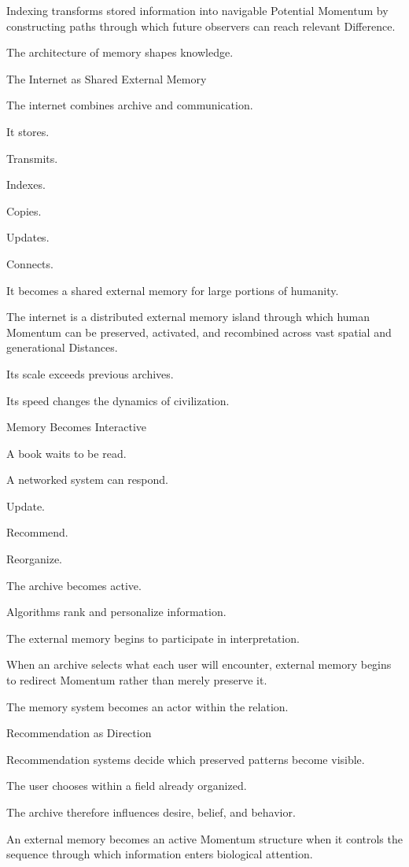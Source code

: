 Indexing transforms stored information into navigable Potential Momentum by constructing paths through which future observers can reach relevant Difference.

The architecture of memory shapes knowledge.

The Internet as Shared External Memory

The internet combines archive and communication.

It stores.

Transmits.

Indexes.

Copies.

Updates.

Connects.

It becomes a shared external memory for large portions of humanity.

The internet is a distributed external memory island through which human Momentum can be preserved, activated, and recombined across vast spatial and generational Distances.

Its scale exceeds previous archives.

Its speed changes the dynamics of civilization.

Memory Becomes Interactive

A book waits to be read.

A networked system can respond.

Update.

Recommend.

Reorganize.

The archive becomes active.

Algorithms rank and personalize information.

The external memory begins to participate in interpretation.

When an archive selects what each user will encounter, external memory begins to redirect Momentum rather than merely preserve it.

The memory system becomes an actor within the relation.

Recommendation as Direction

Recommendation systems decide which preserved patterns become visible.

The user chooses within a field already organized.

The archive therefore influences desire, belief, and behavior.

An external memory becomes an active Momentum structure when it controls the sequence through which information enters biological attention.


